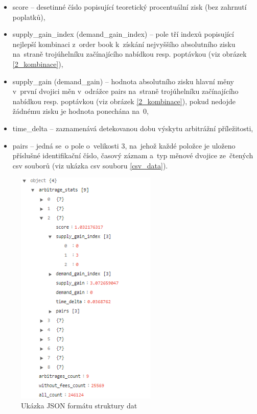 \documentclass[thesis=B,czech]{FITthesis}[2019/03/21]
\begin{document}
\begin{itemize}
    \item score -- desetinné číslo popisující teoretický procentuální zisk (bez zahrnutí poplatků),
    \item supply\_gain\_index (demand\_gain\_index) -- pole tří indexů popisující nejlepší kombinaci z~order book k~získání nejvyššího absolutního zisku na~straně trojúhelníku začínajícího nabídkou resp. poptávkou (viz \linebreak obrázek \ref{2_kombinace}),
    \item supply\_gain (demand\_gain) -- hodnota absolutního zisku hlavní měny v~první dvojici měn v~odrážce pairs na~straně trojúhelníku začínajícího nabídkou resp. poptávkou (viz obrázek \ref{2_kombinace}), pokud nedojde žádnému zisku je hodnota ponechána na~0,
    \item time\_delta -- zaznamenává detekovanou dobu výskytu arbitrážní \linebreak příležitosti, 
    \item pairs -- jedná se~o pole o~velikosti 3, na~jehož každé položce je uloženo příslušné identifikační číslo, časový záznam a~typ měnové dvojice \linebreak ze~čtených csv souborů (viz ukázka csv souboru \ref{csv_data}).
\end{itemize}
\begin{figure}\centering
	\includegraphics[width=0.6\textwidth]{images/json_data.PNG}
	\caption{Ukázka JSON formátu struktury dat}\label{json_data}
\end{figure}
\end{document}
